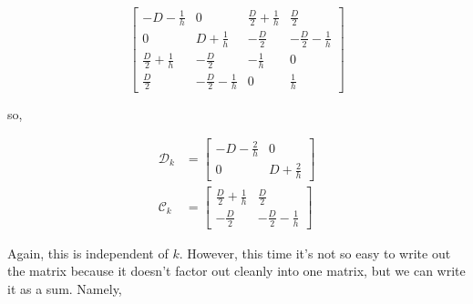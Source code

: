\documentclass{article}
\begin{document}
\[
    \left[\begin{matrix}- D - \frac{1}{h} & 0 & \frac{D}{2} + \frac{1}{h} & \frac{D}{2}\\0 & D + \frac{1}{h} & - \frac{D}{2} & - \frac{D}{2} - \frac{1}{h}\\\frac{D}{2} + \frac{1}{h} & - \frac{D}{2} & - \frac{1}{h} & 0\\\frac{D}{2} & - \frac{D}{2} - \frac{1}{h} & 0 & \frac{1}{h}\end{matrix}\right]
\]

so,

\begin{align}    
    \mathcal{D}_k & = \left[\begin{matrix}- D - \frac{2}{h} & 0\\0 & D + \frac{2}{h}\end{matrix}\right] \\
    \mathcal{C}_k & = \left[\begin{matrix}\frac{D}{2} + \frac{1}{h} & \frac{D}{2}\\- \frac{D}{2} & - \frac{D}{2} - \frac{1}{h}\end{matrix}\right]
\end{align}

Again, this is independent of $k$. However, this time it's not so easy to write out the matrix because it doesn't factor out cleanly into one matrix, but we can write it as a sum. Namely,
\end{document}
